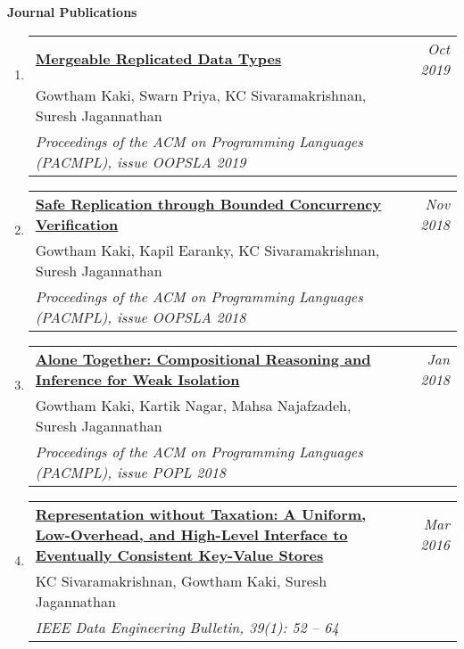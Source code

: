 \documentclass[10pt]{article}
\makeatletter
\newcommand{\lbar}[1]{{\color{#1}\ding{118}}\hspace*{2pt}}
\newenvironment{benumerate}[2]{
    \let\oldItem\item
    \def\item{\addtocounter{enumi}{-2}\oldItem}
    \begin{enumerate}[#2] \itemsep3pt
    \setcounter{enumi}{#1}
    \addtocounter{enumi}{1}}
  {\end{enumerate}}
\newcommand{\service}[1]{\item $\bullet$ \hspace{1ex}\parbox{7.2in}{#1}}
\newenvironment{publication}[5]
{ \item
  \begin{tabular*}{7.5in}{p{6.3in}@{\extracolsep{\fill}}r}
    \href{#1}{\textbf{#2}} & \textit{#3}\\ #4 &\\ \textit{#5}&\\
  \end{tabular*}
} {}
\newenvironment{region}[3]{%
  \vspace*{0.5ex}
  {{\textbf{\large{#1}}}}
  \begin{benumerate}{#3}{\color{RoyalBlue}#2}}
  {\end{benumerate}\vspace{0.8ex}}
\newenvironment{itemregion}[1]{
  \vspace*{0.5ex}
  {{\textbf{\large{#1}}}}
  \begin{itemize}\itemsep1pt}
  {\end{itemize}\vspace{0.8ex}}
\makeatother
\begin{document}

\begin{region} {\lbar{Mahogany}Journal Publications}{{J}1}{4}

	\begin{publication}{https://gowthamk.github.io/docs/mrdt.pdf}
		{Mergeable Replicated Data Types}
    {Oct 2019}{Gowtham Kaki, Swarn Priya, KC Sivaramakrishnan, Suresh Jagannathan}
		{Proceedings of the ACM on Programming Languages (PACMPL), issue OOPSLA 2019}
  \end{publication}

	\begin{publication}{https://gowthamk.github.io/docs/q9.pdf}
		{Safe Replication through Bounded Concurrency Verification}
    {Nov 2018}{Gowtham Kaki, Kapil Earanky, KC Sivaramakrishnan, Suresh Jagannathan}
		{Proceedings of the ACM on Programming Languages (PACMPL), issue OOPSLA 2018}
  \end{publication}

  \begin{publication}{https://gowthamk.github.io/docs/popl18.pdf}
    {Alone Together: Compositional Reasoning and Inference for Weak Isolation}
    {Jan 2018}
    {Gowtham Kaki, Kartik Nagar, Mahsa Najafzadeh, Suresh Jagannathan}
    {Proceedings of the ACM on Programming Languages (PACMPL), issue POPL 2018}
  \end{publication}

  \begin{publication}{https://gowthamk.github.io/docs/quelea_ieee16.pdf}
    {Representation without Taxation: A Uniform, Low-Overhead, and High-Level Interface to Eventually Consistent Key-Value Stores}
    {Mar 2016}{KC Sivaramakrishnan, Gowtham Kaki, Suresh Jagannathan}
    {IEEE Data Engineering Bulletin, 39(1): 52 -- 64}
  \end{publication}
\end{region}
\end{document}
